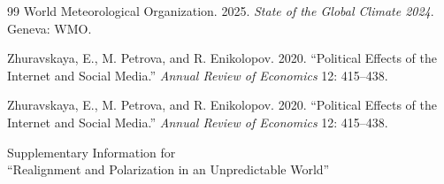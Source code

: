 \documentclass[12pt,letterpaper]{article}
\begin{document}
\begin{thebibliography}{99}
World Meteorological Organization. 2025. \textit{State of the Global Climate 2024}. Geneva: WMO.

Zhuravskaya, E., M. Petrova, and R. Enikolopov. 2020. ``Political Effects of the Internet and Social Media.'' \textit{Annual Review of Economics} 12: 415--438.

Zhuravskaya, E., M. Petrova, and R. Enikolopov. 2020. ``Political Effects of the Internet and Social Media.'' \textit{Annual Review of Economics} 12: 415--438.

\end{thebibliography}

\clearpage
\appendix
\setcounter{page}{1}
\begin{center}
{\Large Supplementary Information for}\\[0.8ex]
{\Large ``Realignment and Polarization in an Unpredictable World''}
\end{center}
\vspace{1em}
\label{app:proofs}
\setcounter{section}{0}\renewcommand{\thesection}{A\arabic{section}}
\providecommand{\theHsection}{}\renewcommand{\theHsection}{A\arabic{section}}
\makeatletter\renewcommand*{}\makeatother
\begingroup\renewcommand{\contentsname}{Contents}\tableofcontents\endgroup
\clearpage
\setcounter{equation}{0}
\setcounter{lemma}{0}
\setcounter{proposition}{0}
\setcounter{corollary}{0}
\setcounter{assumption}{0}
\setcounter{table}{0}\providecommand{\theHtable}{}
\setcounter{figure}{0}\providecommand{\theHfigure}{}
\providecommand{\theHlemma}{}
\renewcommand{\theHlemma}{A.\arabic{lemma}}
\providecommand{\theHproposition}{}
\renewcommand{\theHproposition}{A.\arabic{proposition}}
\providecommand{\theHcorollary}{}
\renewcommand{\theHcorollary}{A.\arabic{corollary}}
\providecommand{\theHassumption}{}
\renewcommand{\theHassumption}{A.\arabic{assumption}}
\end{document}
